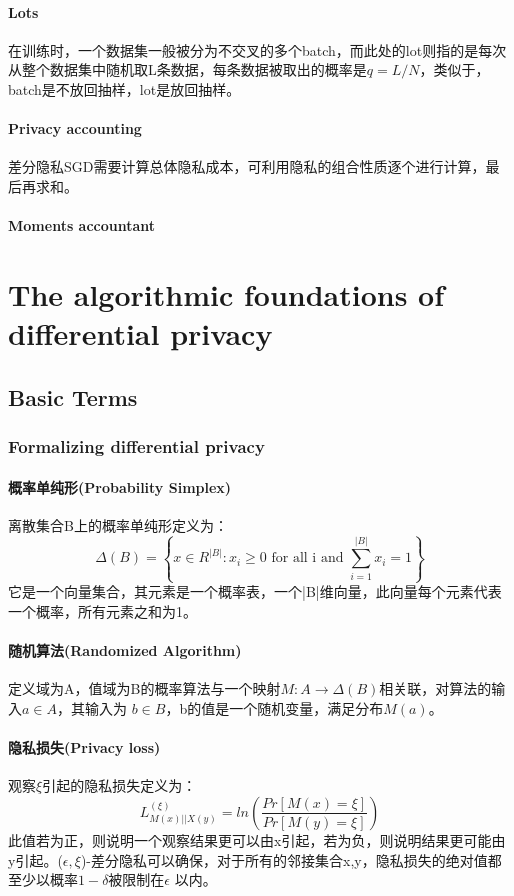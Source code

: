 \documentclass[12pt,a4paper]{article}
\begin{document}
\paragraph{Lots} 在训练时，一个数据集一般被分为不交叉的多个batch，而此处的lot则指的是每次从整个数据集中随机取L条数据，每条数据被取出的概率是$q=L/N$，类似于，batch是不放回抽样，lot是放回抽样。
\paragraph{Privacy accounting} 差分隐私SGD需要计算总体隐私成本，可利用隐私的组合性质逐个进行计算，最后再求和。
\paragraph{Moments accountant} 


\section{The algorithmic foundations of differential privacy\cite{dwork2014algorithmic}}
\subsection{Basic Terms}
\subsubsection{Formalizing differential privacy}

\paragraph{概率单纯形(Probability Simplex)} 离散集合B上的概率单纯形定义为：
\begin{equation}
	\Delta (B) = \left \{ x \in R^{|B|}: x_i \geq \mbox{0 for all i and } \sum_{i=1}^{|B|} x_i=1 \right \}
\end{equation}
它是一个向量集合，其元素是一个概率表，一个|B|维向量，此向量每个元素代表一个概率，所有元素之和为1。
\paragraph{随机算法(Randomized Algorithm)} 定义域为A，值域为B的概率算法与一个映射$M:A \rightarrow \Delta (B)$相关联，对算法的输入$a \in A $，其输入为 $b \in B$，b的值是一个随机变量，满足分布$M(a)$。
\paragraph{隐私损失(Privacy loss)} 观察$\xi$引起的隐私损失定义为：
\begin{equation}
	L^{(\xi)}_{M(x)||X(y)}=ln(\frac{Pr[M(x)=\xi]}{Pr[M(y)=\xi]} )
\end{equation}
此值若为正，则说明一个观察结果更可以由x引起，若为负，则说明结果更可能由y引起。($\epsilon, \xi$)-差分隐私可以确保，对于所有的邻接集合x,y，隐私损失的绝对值都至少以概率$1-\delta$被限制在$\epsilon$ 以内。










\end{document}
